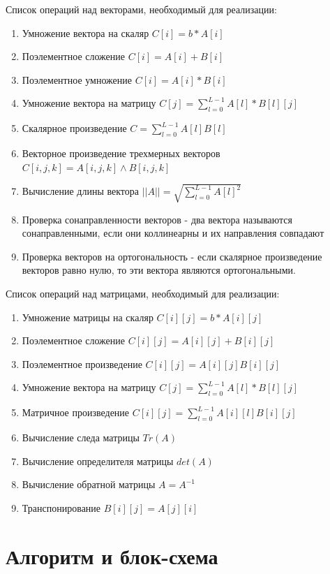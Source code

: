 \documentclass[a4paper,14pt]{extarticle}
\begin{document}
Список операций над векторами, необходимый для реализации:
\begin{enumerate}
	\item Умножение вектора на скаляр $C[i] = b * A[i]$
	\item Поэлементное сложение $C[i] = A[i] + B[i]$
	\item Поэлементное умножение $C[i] = A[i] * B[i]$
	\item Умножение вектора на матрицу 
		$C[j] = \sum\limits_{l=0}^{L-1} A[l] * B[l][j]$ 
	\item Скалярное произведение $C = \sum\limits_{l=0}^{L-1} A[l] B[l]$ 
	\item Векторное произведение трехмерных векторов \\
		$C[i, j, k] = A[i, j, k] \wedge B[i, j, k]$
	\item Вычисление длины вектора
		$|| A || = \sqrt{\sum\limits_{l=0}^{L-1} A[l]^2}$
	\item Проверка сонаправленности векторов - два вектора называются сонаправленными, если они коллинеарны и их направления совпадают
	\item Проверка векторов на ортогональность - если скалярное произведение векторов равно нулю, 	
		то эти вектора являются ортогональными.
\end{enumerate}

Список операций над матрицами, необходимый для реализации:
\begin{enumerate}
	\item Умножение матрицы на скаляр $C[i][j] = b * A[i][j]$
	\item Поэлементное сложение $C[i][j] = A[i][j] + B[i][j]$
	\item Поэлементное произведение $C[i][j] = A[i][j]B[i][j]$
	\item Умножение вектора на матрицу 
		$C[j] = \sum\limits_{l=0}^{L-1} A[l] * B[l][j]$
	\item Матричное произведение 
		$C[i][j] = \sum\limits_{l=0}^{L-1} A[i][l] B[i][j]$
	\item Вычисление следа матрицы $Tr(A)$
	\item Вычисление определителя матрицы $det(A)$
	\item Вычисление обратной матрицы $A = A^{-1}$
	\item Транспонирование $B[i][j] = A[j][i]$
\end{enumerate}

\newpage

\section{Алгоритм и блок-схема}
\end{document}
